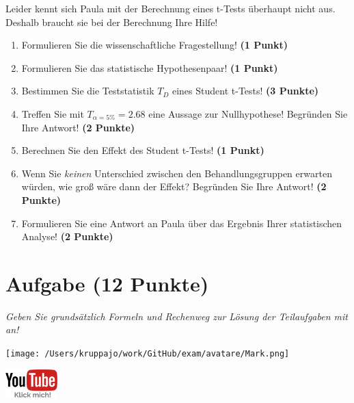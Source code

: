 \documentclass[a4paper, 9pt]{scrartcl}\usepackage[]{graphicx}\usepackage[]{xcolor}
\begin{document}
Leider kennt sich Paula mit der Berechnung eines t-Tests überhaupt nicht aus. Deshalb braucht sie bei der Berechnung Ihre Hilfe!

\begin{enumerate}
  \item Formulieren Sie die wissenschaftliche Fragestellung! \textbf{(1 Punkt)}
  \item Formulieren Sie das statistische Hypothesenpaar! \textbf{(1 Punkt)}
  \item Bestimmen Sie die Teststatistik $T_{D}$ eines Student t-Tests! \textbf{(3 Punkte)}
\item Treffen Sie mit $T_{\alpha = 5\%} = 2.68$ eine Aussage zur Nullhypothese! Begründen Sie Ihre Antwort! \textbf{(2 Punkte)}
\item Berechnen Sie den Effekt des Student t-Tests! \textbf{(1 Punkt)}
\item Wenn Sie \textit{keinen} Unterschied zwischen den Behandlungsgruppen erwarten würden, wie groß wäre dann der Effekt? Begründen Sie Ihre Antwort! \textbf{(2 Punkte)}
\item Formulieren Sie eine Antwort an Paula über das Ergebnis Ihrer statistischen Analyse! \textbf{(2 Punkte)}
\end{enumerate} 
\clearpage

\section{Aufgabe \hfill (12 Punkte)}

\textit{Geben Sie grundsätzlich Formeln und Rechenweg zur Lösung der Teilaufgaben mit an!} \\[1Ex]
 

 
\begin{minipage}[t]{0.5\textwidth}
\texttt{[image: /Users/kruppajo/work/GitHub/exam/avatare/Mark.png]}
\end{minipage}
\begin{minipage}[t]{0.5\textwidth}
\hfill
\href{https://youtu.be/TbSEOMCQYl4}{\includegraphics[width = 2cm]{img/youtube}}
\end{minipage}
\vspace{-3ex}
\end{document}
